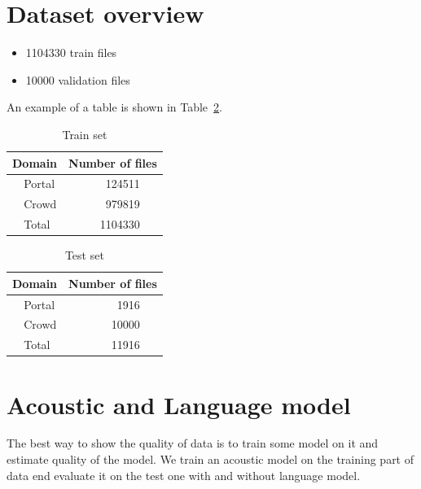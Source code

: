 \documentclass[a4paper]{article}
\begin{document}
\section{Dataset  overview}

\begin{itemize}
\item 1104330 train files
\item 10000 validation files 
\end{itemize}

An example of a table is shown in Table~\ref{tab:example}. 

\begin{table}[th]
  \caption{Train set}
  \label{tab:example}
  \centering
  \begin{tabular}{ r@{}l  r }
    \toprule
    \multicolumn{2}{c}{\textbf{Domain}} & \multicolumn{1}{c}{\textbf{Number of files}} \\
    \midrule
    & Portal & 124511~~~             \\
    & Crowd & 979819~~~               \\

    \bottomrule
    & Total  & 1104330~~~              \\
  \end{tabular}
  
\end{table}


\begin{table}[th]
  \caption{Test set}
  \label{tab:example}
  \centering
  \begin{tabular}{ r@{}l  r }
    \toprule
    \multicolumn{2}{c}{\textbf{Domain}} & \multicolumn{1}{c}{\textbf{Number of files}} \\
    \midrule
    & Portal & 1916~~~  \\
    & Crowd  & 10000~~~ \\
    \bottomrule
    & Total  & 11916~~~ \\
  \end{tabular}
  
\end{table}

\section{Acoustic and Language model}

The best way to show the quality of data is to train some model on it and estimate quality of the model. We train an acoustic model on the training part of data end evaluate it on the test one with and without language model.
\end{document}
